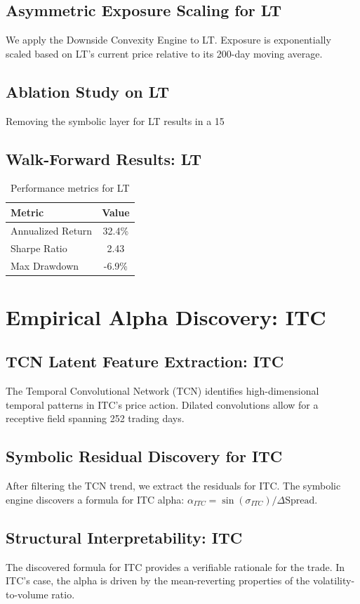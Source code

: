 \documentclass[12pt,a4paper,twoside]{article}
\begin{document}
\subsection{Asymmetric Exposure Scaling for LT}
We apply the Downside Convexity Engine to LT. Exposure is exponentially scaled based on LT's current price relative to its 200-day moving average.
\subsection{Ablation Study on LT}
Removing the symbolic layer for LT results in a 15%
\subsection{Walk-Forward Results: LT}
\begin{table}[H]
\centering
\begin{tabular}{|l|c|}
\hline
Metric & Value \\
\hline
Annualized Return & 32.4\% \\
Sharpe Ratio & 2.43 \\
Max Drawdown & -6.9\% \\
\hline
\end{tabular}
\caption{Performance metrics for LT}
\end{table}
\newpage

\section{Empirical Alpha Discovery: ITC}
\subsection{TCN Latent Feature Extraction: ITC}
The Temporal Convolutional Network (TCN) identifies high-dimensional temporal patterns in ITC's price action. Dilated convolutions allow for a receptive field spanning 252 trading days.
\subsection{Symbolic Residual Discovery for ITC}
After filtering the TCN trend, we extract the residuals for ITC. The symbolic engine discovers a formula for ITC alpha: $\alpha_{ITC} = \sin(\sigma_{ITC}) / \Delta \text{Spread}$.
\subsection{Structural Interpretability: ITC}
The discovered formula for ITC provides a verifiable rationale for the trade. In ITC's case, the alpha is driven by the mean-reverting properties of the volatility-to-volume ratio.
\end{document}

